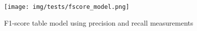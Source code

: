 		\begin{figure}[H]
				\begin{center}
			    \texttt{[image: img/tests/fscore\_model.png]}
				\caption[F1-score table model]{F1-score table model using precision and recall measurements}
				\end{center}
		\end{figure}







